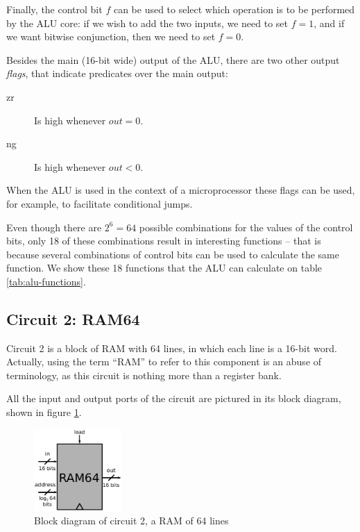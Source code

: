         Finally, the control bit $f$ can be used to select which operation is to be performed by the
        ALU core: if we wish to add the two inputs, we need to set $f = 1$, and if we want bitwise
        conjunction, then we need to set $f = 0$.

        Besides the main (16-bit wide) output of the ALU, there are two other output \emph{flags},
        that indicate predicates over the main output:

        \begin{description}
            \item[zr] Is high whenever $out = 0$.
            \item[ng] Is high whenever $out < 0$.
        \end{description}

        When the ALU is used in the context of a microprocessor these flags can be used, for
        example, to facilitate conditional jumps.

        Even though there are $2^{6} = 64$ possible combinations for the values of the control bits,
        only 18 of these combinations result in interesting functions -- that is because several
        combinations of control bits can be used to calculate the same function. We show these 18
        functions that the ALU can calculate on table \ref{tab:alu-functions}.
        



    \subsection{Circuit 2: RAM64}
    \label{subsec:ram-circuit}

        Circuit 2 is a block of RAM with 64 lines, in which each line is a 16-bit word.  Actually,
        using the term ``RAM'' to refer to this component is an abuse of terminology, as this
        circuit is nothing more than a register bank.

        All the input and output ports of the circuit are pictured in its block diagram, shown
        in figure \ref{fig:ram-block}.

        \begin{figure}[h!]
            \centerline{\includegraphics[width=0.3\textwidth]{imgs/ram-block.pdf}}
            \caption{Block diagram of circuit 2, a RAM of 64 lines
                \label{fig:ram-block}}
        \end{figure}

